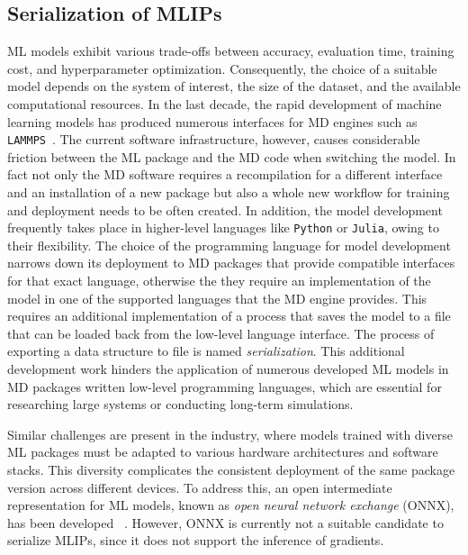 \subsection{Serialization of MLIPs}
ML models exhibit various trade-offs between accuracy, evaluation time, training cost, and hyperparameter optimization.
Consequently, the choice of a suitable model depends on the system of interest, the size of the dataset, and the available computational resources.
In the last decade, the rapid development of machine learning models has produced numerous interfaces for MD engines such as \texttt{LAMMPS}~\cite{lammpsmliap,lammpsmlpace,lammpsmlpod,lammpsmlquip,lammpsmlhdnnp}.
The current software infrastructure, however, causes considerable friction between the ML package and the MD code when switching the model.
In fact not only the MD software requires a recompilation for a different interface and an installation of  a new package but also a whole new workflow for training and deployment needs to be often created.
In addition, the model development frequently takes place in higher-level languages like \texttt{Python} or \texttt{Julia}, owing to their flexibility.
The choice of the programming language for model development narrows down its deployment to MD packages that provide compatible interfaces for that exact language, otherwise the they require an implementation of the model in one of the supported languages that the MD engine provides.
This requires an additional implementation of a process that saves the model to a file that can be loaded back from the low-level language interface.
The process of exporting a data structure to file is named \emph{serialization}.
This additional development work hinders the application of numerous developed ML models in MD packages written low-level programming languages, which are essential for researching large systems or conducting long-term simulations.


Similar challenges are present in the industry, where models trained with diverse ML packages must be adapted to various hardware architectures and software stacks.
This diversity complicates the consistent deployment of the same package version across different devices.
To address this, an open intermediate representation for ML models, known as \emph{open neural network exchange} (ONNX), has been developed ~\cite{bai2019}.
However, ONNX is currently not a suitable candidate to serialize MLIPs, since it does not support the inference of gradients.

